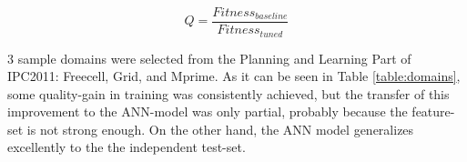 \documentclass{MYsig-alternate}
\begin{document}
\begin{equation}Q=\frac{Fitness_{baseline}}{Fitness_{tuned}}\end{equation}

3 sample domains were selected from the Planning and Learning Part of IPC2011: Freecell, Grid, and Mprime. As it can be seen in Table \ref{table:domains}, some quality-gain in training was consistently achieved, but the transfer of this improvement to the ANN-model was only partial, probably because the feature-set is not strong enough. On the other hand, the ANN model generalizes excellently to the the independent test-set. 



\end{document}
